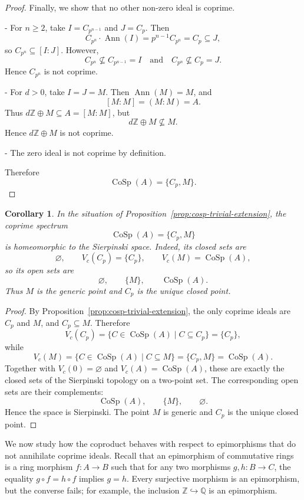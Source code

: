 \documentclass{amsart}
\newtheorem{corollary}{Corollary}
\DeclareMathOperator{\ann}{Ann}
\begin{document}
\begin{proof}
Finally, we show that no other non-zero ideal is coprime.

- For $n\ge 2$, take $I=C_{p^{n-1}}$ and $J=C_p$. Then
  \[
  C_{p^n}\cdot\ann(I)=p^{n-1}C_{p^n}=C_p\subseteq J,
  \]
  so $C_{p^n}\subseteq [I:J]$. However,
  \[
  C_{p^n}\not\subseteq C_{p^{n-1}}=I
  \quad\text{and}\quad
  C_{p^n}\not\subseteq C_p=J.
  \]
  Hence $C_{p^n}$ is not coprime.

- For $d>0$, take $I=J=M$. Then $\ann(M)=M$, and
  \[
  [M:M]=(M:M)=A.
  \]
  Thus $d\mathbb Z\oplus M\subseteq A=[M:M]$, but
  \[
  d\mathbb Z\oplus M\not\subseteq M.
  \]
  Hence $d\mathbb Z\oplus M$ is not coprime.

- The zero ideal is not coprime by definition.

Therefore
\[
\operatorname{CoSp}(A)=\{C_p,M\}.
\]
\end{proof}

\begin{corollary}\label{cor:cosp-trivial-extension-sierpinski}
In the situation of Proposition~\ref{prop:cosp-trivial-extension}, the coprime spectrum
\[
\operatorname{CoSp}(A)=\{C_p,M\}
\]
is homeomorphic to the Sierpinski space. Indeed, its closed sets are
\[
\varnothing,\qquad V_c(C_p)=\{C_p\},\qquad V_c(M)=\operatorname{CoSp}(A),
\]
so its open sets are
\[
\varnothing,\qquad \{M\},\qquad \operatorname{CoSp}(A).
\]
Thus $M$ is the generic point and $C_p$ is the unique closed point.
\end{corollary}

\begin{proof}
By Proposition~\ref{prop:cosp-trivial-extension}, the only coprime ideals are $C_p$ and $M$, and $C_p\subseteq M$. Therefore
\[
V_c(C_p)=\{C\in\operatorname{CoSp}(A)\mid C\subseteq C_p\}=\{C_p\},
\]
while
\[
V_c(M)=\{C\in\operatorname{CoSp}(A)\mid C\subseteq M\}=\{C_p,M\}=\operatorname{CoSp}(A).
\]
Together with $V_c(0)=\varnothing$ and $V_c(A)=\operatorname{CoSp}(A)$, these are exactly the closed sets of the Sierpinski topology on a two-point set. The corresponding open sets are their complements:
\[
\operatorname{CoSp}(A),\qquad \{M\},\qquad \varnothing.
\]
Hence the space is Sierpinski. The point $M$ is generic and $C_p$ is the unique closed point.
\end{proof}

We now study how the coproduct behaves with respect to epimorphisms that do not annihilate coprime ideals. Recall that an epimorphism of commutative rings is a ring morphism $f\colon A\to B$ such that for any two morphisms $g,h\colon B\to C$, the equality $g\circ f=h\circ f$ implies $g=h$. Every surjective morphism is an epimorphism, but the converse fails; for example, the inclusion $\mathbb Z\hookrightarrow \mathbb Q$ is an epimorphism.
\end{document}
